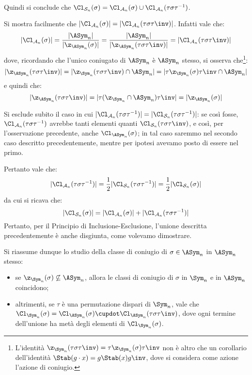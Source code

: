 \documentclass[11pt]{scrartcl}
\begin{document}
	Quindi si conclude che $\Cl_{\mathcal{S}_n}(\sigma) = \Cl_{\mathcal{A}_n}(\sigma) \cup
	\Cl_{\mathcal{A}_n}(\tau\sigma\tau^{-1})$.
	
	
	\begin{remark}
		Si mostra facilmente che $\lvert \Cl_{\mathcal{A}_n}(\sigma) \rvert  = \lvert \Cl_{\mathcal{A}_n}(\tau \sigma \tau\inv) \rvert$. Infatti vale che:
		\[ \lvert \Cl_{\mathcal{A}_n}(\sigma) \rvert = \frac{\lvert \ASym_n \rvert}{\lvert \z_{\ASym_n}(\sigma) \rvert} = \frac{\lvert \ASym_n \rvert}{\lvert \z_{\ASym_n}(\tau \sigma \tau\inv) \rvert} = \lvert \Cl_{\mathcal{A}_n}(\tau \sigma \tau\inv) \rvert \]
		dove, ricordando che l'unico coniugato di $\ASym_n$ è $\ASym_n$ stesso, si osserva che\footnote{
			L'identità $\z_{\Sym_n}(\tau \sigma \tau\inv) = \tau \z_{\Sym_n}(\sigma) \tau\inv$
			non è altro che un corollario dell'identità $\Stab(g \cdot x) = g \Stab(x) g\inv$,
			dove si considera come azione l'azione di coniugio.
		}:
		\[ \lvert \z_{\ASym_n}(\tau \sigma \tau\inv) \rvert = \lvert \z_{\Sym_n}(\tau \sigma \tau\inv) \cap \ASym_n \rvert = \lvert \tau \z_{\Sym_n}(\sigma) \tau\inv \cap \ASym_n \rvert \]
		e quindi che:
		\[ \lvert \z_{\ASym_n}(\tau \sigma \tau\inv) \rvert = \lvert \tau ( \z_{\Sym_n} \cap \ASym_n) \tau\inv \rvert = \lvert \z_{\ASym_n}(\sigma) \rvert \]
	\end{remark}
	
	
	Si esclude subito il caso in cui $\lvert \Cl_{\mathcal{A}_n}(\tau\sigma\tau^{-1}) \rvert = \lvert \Cl_{\mathcal{S}_n}(\tau\sigma\tau^{-1}) \rvert$: se così fosse,
	$\Cl_{\mathcal{A}_n}(\tau\sigma\tau^{-1})$ avrebbe tanti elementi quanti
	$\Cl_{\mathcal{S}_n}(\tau\sigma\tau\inv)$, e così, per l'osservazione precedente, anche $\Cl_{\ASym_n}(\sigma)$; in
	tal caso saremmo nel secondo caso descritto precedentemente, mentre per ipotesi avevamo
	posto di essere nel primo. \medskip
	
	
	Pertanto vale che:
	\[ \lvert \Cl_{\mathcal{A}_n}(\tau\sigma\tau^{-1}) \rvert = \frac{1}{2} \lvert \Cl_{\mathcal{S}_n}(\tau\sigma\tau^{-1}) \rvert = \frac{1}{2} \lvert \Cl_{\mathcal{S}_n}(\sigma) \rvert \]
	da cui si ricava che:
	\[ \lvert \Cl_{\mathcal{S}_n}(\sigma) \rvert = \lvert \Cl_{\mathcal{A}_n}(\sigma) \rvert + \lvert \Cl_{\mathcal{A}_n}(\tau\sigma\tau^{-1}) \rvert \]
	Pertanto, per il Principio di Inclusione-Esclusione, l'unione descritta precedentemente
	è anche disgiunta, come volevamo dimostrare. \medskip
	
	
	Si riassume dunque lo studio della classe di coniugio di $\sigma \in \ASym_n$ in $\ASym_n$ stesso:
	\begin{itemize}
		\item se $\z_{\Sym_n}(\sigma) \not\subseteq \ASym_n$, allora le classi di coniugio di
		$\sigma$ in $\Sym_n$ e in $\ASym_n$ coincidono;
		\item altrimenti, se $\tau$ è una permutazione dispari di $\Sym_n$, vale
		che $\Cl_{\Sym_n}(\sigma) = \Cl_{\ASym_n}(\sigma) \cupdot \Cl_{\ASym_n}(\tau\sigma\tau\inv)$, dove ogni termine dell'unione ha metà degli
		elementi di $\Cl_{\Sym_n}(\sigma)$.
		
	\end{itemize}
	
\end{document}
